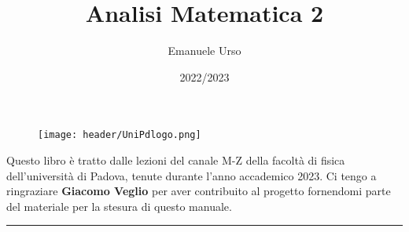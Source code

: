 \documentclass[a4paper]{article}
\begin{document}
	

	
	\title{\Huge Analisi Matematica 2}
	\author{{\Large Emanuele Urso} \\
	{\small{\href{mailto:emanuele.urso@studenti.unipd.it}{\color{black}{emanuele.urso@studenti.unipd.it} }}}}
	\date{2022/2023}
	\maketitle
	
	\begin{figure}[!h]
		\centering
		\texttt{[image: header/UniPdlogo.png]}
	\end{figure}
	
	\vfill
	
	Questo libro è tratto dalle lezioni del canale M-Z della facoltà di fisica dell'università di Padova, tenute durante l'anno accademico 2023. Ci tengo a ringraziare \textbf{Giacomo Veglio} per aver contribuito al progetto fornendomi parte del materiale per la stesura di questo manuale.
	
	\vspace{10em}
	
	
	\begin{center}
		\rule{.9\textwidth}{0.4pt}%
	\end{center}
	
	\hypersetup{linkcolor=black}
	\tableofcontents   
	
\newpage



\newpage



\newpage



\newpage



\newpage



\newpage


\end{document}
